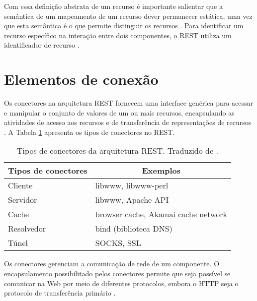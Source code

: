     Com essa definição abstrata de um recurso é importante salientar que a semântica de um mapeamento de um recurso dever permanecer
    estática, uma vez que esta semântica é o que permite distinguir os recursos \cite{fielding2002}. Para identificar um recurso específico na interação entre dois componentes, o REST utiliza um identificador de recurso \cite{fielding2002}.
 
  
  \section*{Elementos de conexão}
  
    Os conectores na arquitetura REST fornecem uma interface genérica para acessar e manipular o conjunto de valores de um ou mais recursos,
    encapsulando as atividades de acesso aos recursos e de transferência de representações de recursos \cite{fielding2002}.
    A Tabela \ref{rest-connectors-elements} apresenta os tipos de conectores no REST.
    
    \begin{table}[ht!]
    \centering
    \caption{Tipos de conectores da arquitetura REST. Traduzido de \cite{fielding2002}.}
    \label{rest-connectors-elements}
    \begin{tabular}{l|l}
    \hline
    \multicolumn{1}{c|}{\textbf{Tipos de conectores}} & \multicolumn{1}{c}{\textbf{Exemplos}} \\ \hline
    Cliente                                            & libwww, libwww-perl                    \\ \hline
    Servidor                                           & libwww, Apache API                     \\ \hline
    Cache                                              & browser cache, Akamai cache network    \\ \hline
    Resolvedor                                         & bind (biblioteca DNS)                  \\ \hline
    Túnel                                              & SOCKS, SSL                             \\ \hline
    \end{tabular}
    \end{table}
    
    Os conectores gerenciam a comunicação de rede de um componente. 
    O encapsulamento possibilitado pelos conectores permite que seja possível se comunicar na Web por meio de diferentes protocolos,
    embora o HTTP seja o protocolo de transferência primário \cite{fielding2002}. 
    
    
    